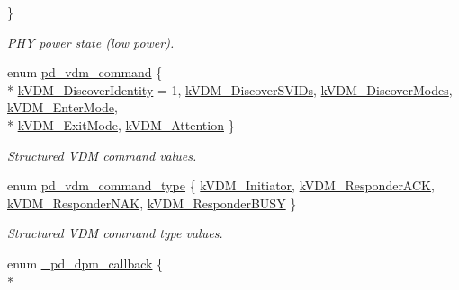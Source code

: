 \begin{DoxyCompactItemize}
 \}
\begin{DoxyCompactList}\small\item\em P\-H\-Y power state (low power). \end{DoxyCompactList}\item 
enum \hyperlink{group__usb__pd__stack_gac4a67ecdc78b1a071ca6505a765a301f}{pd\-\_\-vdm\-\_\-command} \{ \\*
\hyperlink{group__usb__pd__stack_ggac4a67ecdc78b1a071ca6505a765a301fa093484740fe8a0d1886fd86ab3ddab3e}{k\-V\-D\-M\-\_\-\-Discover\-Identity} = 1, 
\hyperlink{group__usb__pd__stack_ggac4a67ecdc78b1a071ca6505a765a301fa3467f9c1fa07c560f41145a00fcd25da}{k\-V\-D\-M\-\_\-\-Discover\-S\-V\-I\-Ds}, 
\hyperlink{group__usb__pd__stack_ggac4a67ecdc78b1a071ca6505a765a301fae6922b747be7bb80dbe7822a940bab16}{k\-V\-D\-M\-\_\-\-Discover\-Modes}, 
\hyperlink{group__usb__pd__stack_ggac4a67ecdc78b1a071ca6505a765a301fa171284120b4265e1e8d90b279682a7bf}{k\-V\-D\-M\-\_\-\-Enter\-Mode}, 
\\*
\hyperlink{group__usb__pd__stack_ggac4a67ecdc78b1a071ca6505a765a301fa1457e1ea577c3e45e1d4a657cd5005d7}{k\-V\-D\-M\-\_\-\-Exit\-Mode}, 
\hyperlink{group__usb__pd__stack_ggac4a67ecdc78b1a071ca6505a765a301fa6c3e8356521df30c2a7cb1100623676f}{k\-V\-D\-M\-\_\-\-Attention}
 \}
\begin{DoxyCompactList}\small\item\em Structured V\-D\-M command values. \end{DoxyCompactList}\item 
enum \hyperlink{group__usb__pd__stack_gaa6b2f8f6620280d0d17ab102c5992ca8}{pd\-\_\-vdm\-\_\-command\-\_\-type} \{ \hyperlink{group__usb__pd__stack_ggaa6b2f8f6620280d0d17ab102c5992ca8a0081a7547bb0feb88cd34c46cc1e9146}{k\-V\-D\-M\-\_\-\-Initiator}, 
\hyperlink{group__usb__pd__stack_ggaa6b2f8f6620280d0d17ab102c5992ca8acb0ae92432a26cfeb1e2f841293a030a}{k\-V\-D\-M\-\_\-\-Responder\-A\-C\-K}, 
\hyperlink{group__usb__pd__stack_ggaa6b2f8f6620280d0d17ab102c5992ca8ad942c05cea2c8b85d1a5c4f362962320}{k\-V\-D\-M\-\_\-\-Responder\-N\-A\-K}, 
\hyperlink{group__usb__pd__stack_ggaa6b2f8f6620280d0d17ab102c5992ca8ac8e7ebf2934cfc215b35b2cc66b28113}{k\-V\-D\-M\-\_\-\-Responder\-B\-U\-S\-Y}
 \}
\begin{DoxyCompactList}\small\item\em Structured V\-D\-M command type values. \end{DoxyCompactList}\item 
enum \hyperlink{group__usb__pd__stack_ga6e10571af6af1a42760ea442ab580eb8}{\-\_\-pd\-\_\-dpm\-\_\-callback} \{ \\*

\end{DoxyCompactItemize}
